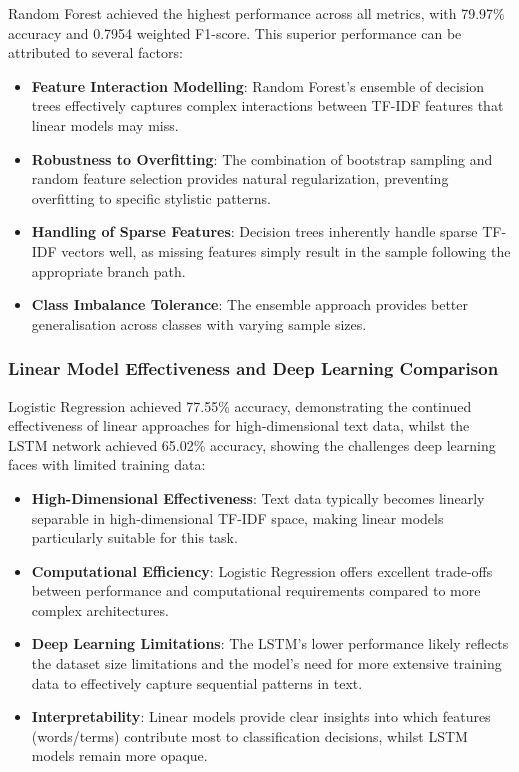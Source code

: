 \documentclass[11pt,a4paper]{article}
\begin{document}
Random Forest achieved the highest performance across all metrics, with 79.97\% accuracy and 0.7954 weighted F1-score. This superior performance can be attributed to several factors:

\begin{itemize}
    \item \textbf{Feature Interaction Modelling}: Random Forest's ensemble of decision trees effectively captures complex interactions between TF-IDF features that linear models may miss.
    
    \item \textbf{Robustness to Overfitting}: The combination of bootstrap sampling and random feature selection provides natural regularization, preventing overfitting to specific stylistic patterns.
    
    \item \textbf{Handling of Sparse Features}: Decision trees inherently handle sparse TF-IDF vectors well, as missing features simply result in the sample following the appropriate branch path.
    
    \item \textbf{Class Imbalance Tolerance}: The ensemble approach provides better generalisation across classes with varying sample sizes.
\end{itemize}

\subsubsection{Linear Model Effectiveness and Deep Learning Comparison}

Logistic Regression achieved 77.55\% accuracy, demonstrating the continued effectiveness of linear approaches for high-dimensional text data, whilst the LSTM network achieved 65.02\% accuracy, showing the challenges deep learning faces with limited training data:

\begin{itemize}
    \item \textbf{High-Dimensional Effectiveness}: Text data typically becomes linearly separable in high-dimensional TF-IDF space, making linear models particularly suitable for this task.
    
    \item \textbf{Computational Efficiency}: Logistic Regression offers excellent trade-offs between performance and computational requirements compared to more complex architectures.
    
    \item \textbf{Deep Learning Limitations}: The LSTM's lower performance likely reflects the dataset size limitations and the model's need for more extensive training data to effectively capture sequential patterns in text.
    
    \item \textbf{Interpretability}: Linear models provide clear insights into which features (words/terms) contribute most to classification decisions, whilst LSTM models remain more opaque.
\end{itemize}
\end{document}

